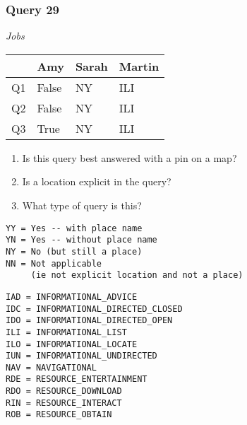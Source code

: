\begin{frame}[fragile]
\frametitle{Query 29}
\vspace{1em}

\emph{Jobs}

\vfill

\begin{table}
  \centering
  \begin{tabular}{ l l l l }
    & \textbf{Amy} & \textbf{Sarah} & \textbf{Martin}\\
    \toprule
    Q1 & False & NY & ILI\\
Q2 & False & NY & ILI\\
Q3 & True & NY & ILI\\
    \bottomrule
  \end{tabular}
\end{table}

\vfill

\tiny{

\begin{enumerate}
\item Is this query best answered with a pin on a map?
\item Is a location explicit in the query?
\item What type of query is this?
\end{enumerate}

\vfill

\begin{multicols}{2}
\begin{verbatim}
YY = Yes -- with place name
YN = Yes -- without place name
NY = No (but still a place)
NN = Not applicable 
     (ie not explicit location and not a place)
\end{verbatim}

\columnbreak
\begin{verbatim}
IAD = INFORMATIONAL_ADVICE
IDC = INFORMATIONAL_DIRECTED_CLOSED
IDO = INFORMATIONAL_DIRECTED_OPEN
ILI = INFORMATIONAL_LIST
ILO = INFORMATIONAL_LOCATE
IUN = INFORMATIONAL_UNDIRECTED
NAV = NAVIGATIONAL
RDE = RESOURCE_ENTERTAINMENT
RDO = RESOURCE_DOWNLOAD
RIN = RESOURCE_INTERACT
ROB = RESOURCE_OBTAIN
\end{verbatim}
\end{multicols}
}

\end{frame}


